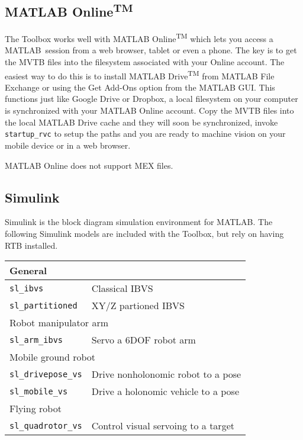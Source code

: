 \documentclass[a4paper,twoside]{report}
\def\Mlab{MATLAB}
\begin{document}
\subsection{MATLAB Online\textsuperscript{TM}}
The Toolbox works well with MATLAB Online\textsuperscript{TM} which lets you access a \Mlab\ session from a web browser, tablet 
or even a phone.
The key is to get the MVTB files into the filesystem associated with your Online account.  The easiest way to do this is to install
MATLAB Drive\textsuperscript{TM} from MATLAB File Exchange or using the Get Add-Ons option from the MATLAB GUI.  This functions
just like Google Drive or Dropbox, a local filesystem on your computer is synchronized with your MATLAB Online account.  Copy the MVTB
files into the local MATLAB Drive cache and they will soon be synchronized, invoke \texttt{startup\_rvc} to setup the paths and you are ready to machine vision on your mobile device or in a web browser.

MATLAB Online does not support MEX files.  

\subsection{Simulink\textsuperscript{\textregistered}}
Simulink\textsuperscript{\textregistered} is the block diagram simulation environment for MATLAB.
The following Simulink models are included with the Toolbox, but rely on having RTB installed.

\begin{center}
\begin{tabular}{|l|l|}\hline
\multicolumn{2}{|l|}{General} \\\hline
\texttt{sl\_ibvs} & Classical IBVS \\
\texttt{sl\_partitioned} &  XY/Z partioned IBVS \\\hline\hline
\multicolumn{2}{|l|}{Robot manipulator arm} \\\hline
\texttt{sl\_arm\_ibvs} &  Servo a 6DOF robot arm\\\hline\hline
\multicolumn{2}{|l|}{Mobile ground robot} \\\hline
\texttt{sl\_drivepose\_vs} &  Drive nonholonomic robot to a pose\\
\texttt{sl\_mobile\_vs} &  Drive a holonomic vehicle to a pose\\\hline\hline
\multicolumn{2}{|l|}{Flying robot} \\\hline
\texttt{sl\_quadrotor\_vs} &  Control visual servoing to a target\\ \hline
\end{tabular}
\end{center}
\end{document}
